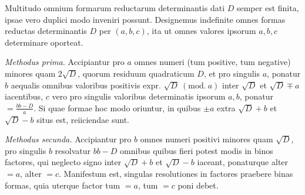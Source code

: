 Multitudo omnium formarum reductarum determinantis dati $D$ semper est finita, ipsae vero duplici modo inveniri possunt. Designemus indefinite omnes formas reductas determinantis $D$ per $(a,b,c)$, ita ut omnes valores ipsorum $a,b,c$ determinare oporteat.

\textit{Methodus prima.} Accipiantur pro $a$ omnes numeri (tum positive, tum negative) minores quam $2\surd D$, quorum residuum quadraticum $D$, et pro singulis $a$, ponatur $b$ aequalis omnibus valoribus positivis expr. $\surd D\ (\mathrm{mod.}\ a)$ inter $\surd D$ et $\surd D\mp a$ iacentibus, $c$ vero pro singulis valoribus determinatis ipsorum $a,b$, ponatur $=\frac{bb-D}{a}$. Si quae formae hoc modo oriuntur, in quibus $\pm a$ extra $\surd D+b$ et $\surd D-b$ situs est, reiiciendae sunt.

\textit{Methodus secunda.} Accipiantur pro $b$ omnes numeri positivi minores quam $\surd D$, pro singulis $b$ resolvatur $bb-D$ omnibus quibus fieri potest modis in binos factores, qui neglecto signo inter $\surd D+b$ et $\surd D-b$ iaceant, ponaturque alter $=a$, alter $=c$. Manifestum est, singulas resolutiones in factores praebere binas formas, quia uterque factor tum $=a$, tum $=c$ poni debet.
